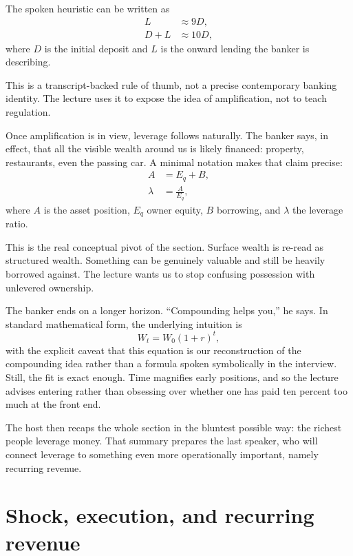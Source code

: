 The spoken heuristic can be written as
\begin{align}
L &\approx 9D,\\
D + L &\approx 10D,
\end{align}
where \(D\) is the initial deposit and \(L\) is the onward lending the banker is describing.

\begin{remark}
This is a transcript-backed rule of thumb, not a precise contemporary banking identity. The lecture uses it to expose the idea of amplification, not to teach regulation.
\end{remark}

Once amplification is in view, leverage follows naturally. The banker says, in effect, that all the visible wealth around us is likely financed: property, restaurants, even the passing car. A minimal notation makes that claim precise:
\begin{align}
A &= E_q + B,\\
\lambda &= \frac{A}{E_q},
\end{align}
where \(A\) is the asset position, \(E_q\) owner equity, \(B\) borrowing, and \(\lambda\) the leverage ratio.

This is the real conceptual pivot of the section. Surface wealth is re-read as structured wealth. Something can be genuinely valuable and still be heavily borrowed against. The lecture wants us to stop confusing possession with unlevered ownership.

The banker ends on a longer horizon. ``Compounding helps you,'' he says. In standard mathematical form, the underlying intuition is
\begin{equation}
W_t = W_0(1+r)^t,
\end{equation}
with the explicit caveat that this equation is our reconstruction of the compounding idea rather than a formula spoken symbolically in the interview. Still, the fit is exact enough. Time magnifies early positions, and so the lecture advises entering rather than obsessing over whether one has paid ten percent too much at the front end.

The host then recaps the whole section in the bluntest possible way: the richest people leverage money. That summary prepares the last speaker, who will connect leverage to something even more operationally important, namely recurring revenue.

\section{Shock, execution, and recurring revenue}

